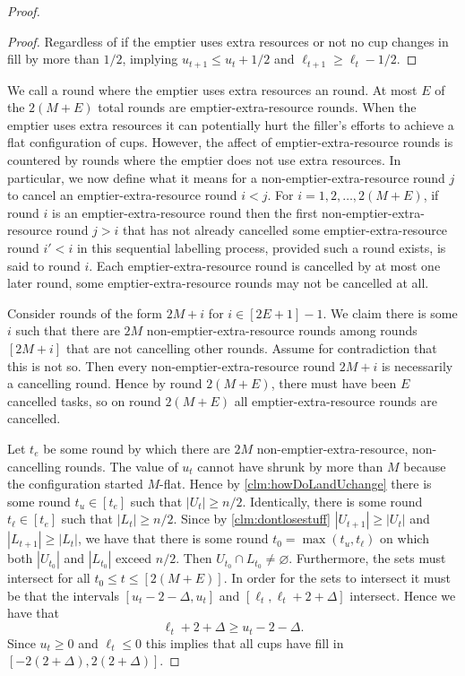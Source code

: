 \begin{proof}
\begin{proof}
    Regardless of if the emptier uses extra resources or not no
    cup changes in fill by more than $1/2$, implying $u_{t+1} \le
    u_t + 1/2$ and $\ell_{t+1} \ge \ell_t - 1/2$. 
  \end{proof}
  
  We call a round where the emptier uses extra resources an
   round. At most $E$ of the
  $2(M+E)$ total rounds are emptier-extra-resource rounds. When
  the emptier uses extra resources it can potentially hurt the
  filler's efforts to achieve a flat configuration of cups.
  However, the affect of emptier-extra-resource rounds is
  countered by rounds where the emptier does not use extra
  resources. In particular, we now define what it means for a
  non-emptier-extra-resource round $j$ to cancel an
  emptier-extra-resource round $i < j$. For $i = 1,2,\ldots,
  2(M+E)$, if round $i$ is an emptier-extra-resource round then
  the first non-emptier-extra-resource round $j > i$ that has not
  already cancelled some emptier-extra-resource round $i' < i$ in
  this sequential labelling process, provided such a round
  exists, is said to  round $i$. Each
  emptier-extra-resource round is cancelled by at most one later
  round, some emptier-extra-resource rounds may not be cancelled
  at all.

  Consider rounds of the form $2M + i$ for $i \in [2E+1]-1$. We
  claim there is some $i$ such that there are $2M$
  non-emptier-extra-resource rounds among rounds $[2M + i]$ that
  are not cancelling other rounds. Assume for contradiction that
  this is not so. Then every non-emptier-extra-resource round $2M + i$
  is necessarily a cancelling round. Hence by round $2(M + E)$,
  there must have been $E$ cancelled tasks, so on round $2(M+E)$
  all emptier-extra-resource rounds are cancelled.

  Let $t_e$ be some round by which there are $2M$
  non-emptier-extra-resource, non-cancelling rounds. The value of
  $u_t$ cannot have shrunk by more than $M$ because the
  configuration started $M$-flat. Hence by
  \cref{clm:howDoLandUchange} there is some round $t_u \in [t_e]$
  such that $|U_t|\ge n/2$. Identically, there is some round
  $t_\ell \in [t_e]$ such that $|L_t| \ge n/2$. Since by
  \cref{clm:dontlosestuff} $|U_{t+1}|\ge |U_t|$ and $|L_{t+1}|
  \ge |L_t|$, we have that there is some round $t_0 =\max(t_u,
  t_\ell)$ on which both $|U_{t_0}|$ and $|L_{t_0}|$ exceed
  $n/2$. Then $U_{t_0} \cap L_{t_0} \neq \varnothing$.
  Furthermore, the sets must intersect for all $t_0 \le t \le
  [2(M+E)]$. In order for the sets to intersect it must be that
  the intervals $[u_t-2-\Delta, u_t]$ and $[\ell_t,
  \ell_t+2+\Delta]$ intersect. Hence we have that
  $$\ell_t+2+\Delta \ge u_t-2-\Delta.$$ Since $u_t \ge 0$ and
  $\ell_t \le 0$ this implies that all cups have fill in
  $[-2(2+\Delta), 2(2+\Delta)]$.

\end{proof}

